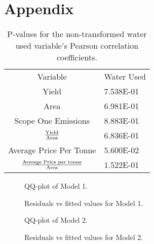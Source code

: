 \documentclass[10pt,letterpaper]{article}
\begin{document}
\nolinenumbers

% 


 \appendix

\section*{Appendix}
\par

\begin{table}[htb]
      \caption{P-values for the non-transformed water used variable's Pearson correlation coefficients.}
      \begin{tabular}{cl}
      Variable                                           & Water Used \\
      Yield                                              & 7.538E-01  \\
      Area                                               & 6.981E-01  \\
      Scope One Emissions                                & 8.883E-01  \\
      $\textrm{Yield}\over\textrm{Area}$                     & 6.836E-01  \\
      Average Price Per Tonne                            & 5.600E-02  \\
      ${\textrm{Average Price per tonne}\over\textrm{Area}}$ & 1.522E-01 
      \end{tabular}
\end{table}


\begin{figure}[htb]
  \caption{QQ-plot of Model 1.}
\end{figure}

\begin{figure}[htb]
  \caption{Residuals vs fitted values for Model 1.}
\end{figure}

\begin{figure}[htb]
  \caption{QQ-plot of Model 2.}
\end{figure}

\begin{figure}[htb]
  \caption{Residuals vs fitted values for Model 2.}
\end{figure}
\end{document}
